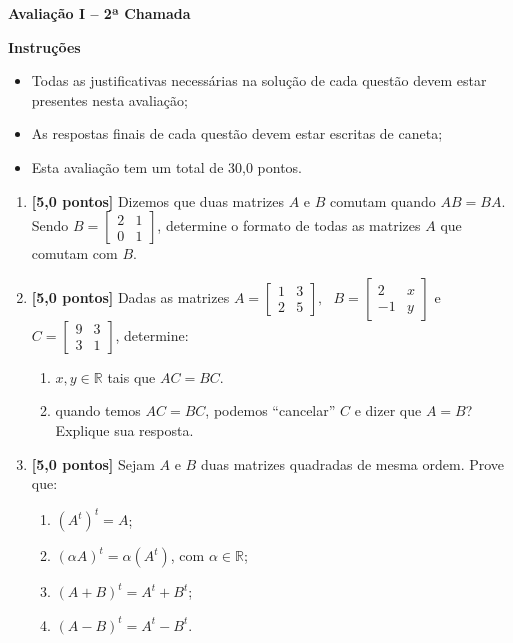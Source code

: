 \documentclass[12pt,a4paper]{article}
\begin{document}
\begin{center}
 \textbf{Avaliação I -- 2ª Chamada}
\end{center}

\textbf{Instruções}
\begin{itemize}
 \item Todas as justificativas necessárias na solução de cada questão devem estar presentes nesta avaliação;
 \item As respostas finais de cada questão devem estar escritas de caneta;
 \item Esta avaliação tem um total de 30,0 pontos.
\end{itemize}

\begin{enumerate}
  \item \textbf{[5,0 pontos]} Dizemos que duas matrizes $A$ e $B$ comutam quando $AB=BA$. Sendo
    $B=\left[\begin{array}{rr}
      2 & 1\\
      0 & 1
    \end{array}\right]$, determine o formato de todas as matrizes $A$ que comutam com $B$.

  \item \textbf{[5,0 pontos]} Dadas as matrizes
    $A=
      \begin{bmatrix}
        1 & 3 \\
        2 & 5
      \end{bmatrix},
      \ \ \ 
    B=\begin{bmatrix}
      2 & x \\
      -1 & y
    \end{bmatrix}$ e 
    $C=\begin{bmatrix}
      9 & 3 \\
      3 & 1
    \end{bmatrix}$, determine:

    \begin{enumerate}
      \item $x , y \in\mathbb{R}$ tais que $AC=BC$.
     \item quando temos $AC=BC$, podemos ``cancelar'' $C$ e dizer que $A=B$? Explique sua resposta.
    \end{enumerate}

  \item \textbf{[5,0 pontos]} Sejam $A$ e $B$ duas matrizes quadradas de mesma ordem. Prove que:
    \begin{enumerate}
      \item $\left(A^t\right)^t = A$;
      \item $\left(\alpha A\right)^t = \alpha(A^t)$, com $\alpha\in\mathbb{R}$;
      \item $(A + B)^t = A^t + B^t$;
      \item $(A - B)^t = A^t - B^t$.
    \end{enumerate}


\end{enumerate}
\end{document}
